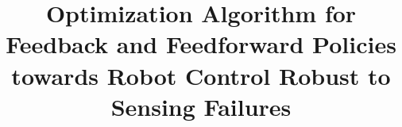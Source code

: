 \documentclass{bmcart}
\begin{document}
\begin{frontmatter}

\begin{fmbox}


\title{Optimization Algorithm for Feedback and Feedforward Policies towards Robot Control Robust to Sensing Failures}


\author[
   addressref={naist},                   %
   corref={naist},                       %
   email={kobayashi@is.naist.jp}   %
]{ }
\author[
   addressref={naist},
]{ }


\address[id=naist]{%
  , %
  ,                     %
  ,                              %
}


\end{fmbox}
\end{frontmatter}
\end{document}
